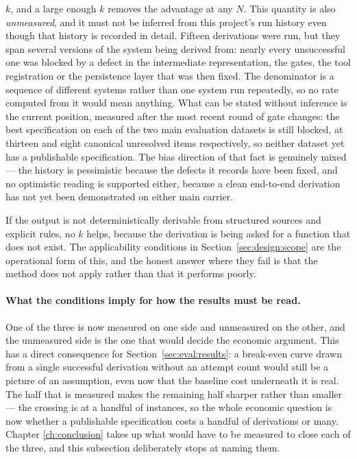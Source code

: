 \begin{description}
    $k$, and a large enough $k$ removes the advantage at any $N$. This quantity is also
    \emph{unmeasured}, and it must not be inferred from this project's run history even though
    that history is recorded in detail. Fifteen derivations were run, but they span several
    versions of the system being derived from: nearly every unsuccessful one was blocked by a
    defect in the intermediate representation, the gates, the tool registration or the
    persistence layer that was then fixed. The denominator is a sequence of different systems
    rather than one system run repeatedly, so no rate computed from it would mean anything. What
    can be stated without inference is the current position, measured after the most recent round
    of gate changes: the best specification on each of the two main evaluation datasets is still
    blocked, at thirteen and eight canonical unresolved items respectively, so neither dataset yet
    has a publishable specification. The bias direction of that fact is
    genuinely mixed --- the history is pessimistic because the defects it records have been
    fixed, and no optimistic reading is supported either, because a clean end-to-end derivation
    has not yet been demonstrated on either main carrier.
  \item[C-iii --- the task is outside the class.] If the output is not deterministically
    derivable from structured sources and explicit rules, no $k$ helps, because the derivation
    is being asked for a function that does not exist. The applicability conditions in
    Section~\ref{sec:design:scope} are the operational form of this, and the honest answer where
    they fail is that the method does not apply rather than that it performs poorly.
\end{description}

\paragraph{What the conditions imply for how the results must be read.}
One of the three is now measured on one side and unmeasured on the other, and the unmeasured
side is the one that would decide the economic argument. This has a direct consequence for
Section~\ref{sec:eval:results}: a break-even curve drawn from a single successful derivation
without an attempt count would still be a picture of an assumption, even now that the baseline
cost underneath it is real. The half that is measured makes the remaining half sharper rather
than smaller --- the crossing is at a handful of instances, so the whole economic question is
now whether a publishable specification costs a handful of derivations or many. Chapter
\ref{ch:conclusion} takes up what would have to be measured to close each of the three, and this
subsection deliberately stops at naming them.

